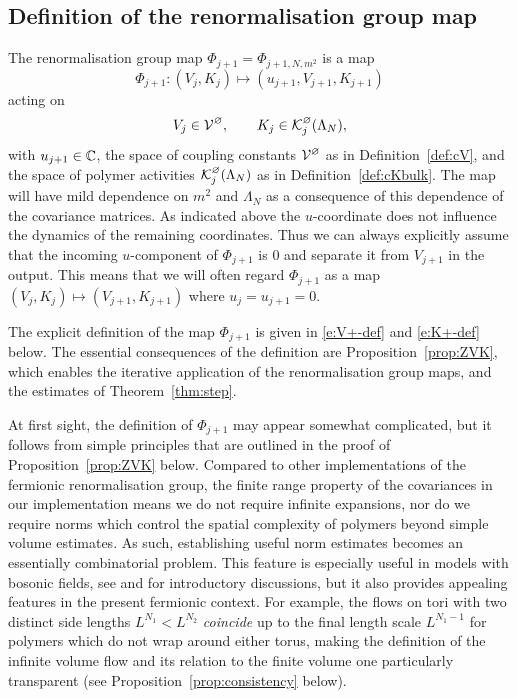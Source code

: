 \documentclass[11pt]{amsart}
\numberwithin{equation}{section}
\numberwithin{theorem}{section}
\newcommand{\1}{{\bf 1}}
\newcommand{\cVbulk}{\cV^\varnothing}
\newcommand{\cKbulk}{\cK^\varnothing}
\begin{document}
\subsection{Definition of the renormalisation group map}
\label{sec:step-def}

The renormalisation group map $\Phi_{j+1} = \Phi_{j+1,N,m^{2}}$ is a map
\begin{equation}
  \Phi_{j+1}\colon (V_j,K_j) \mapsto (u_{j+1},V_{j+1},K_{j+1})
\end{equation}
acting on
\begin{equation}
  V_j  \in \cVbulk, 
  \qquad K_j \in \cKbulk_j(\Lambda_N), 
\end{equation}
with $u_{j+1}\in\mathbb{C}$, the space of coupling constants $\cVbulk$ as in Definition~\ref{def:cV}, and
the space of polymer activities
$\cKbulk_j(\Lambda_N)$ as in Definition~\ref{def:cKbulk}.
%
%
The map will have mild dependence on $m^2$ and $\Lambda_N$ as a
consequence of this dependence of the covariance matrices. As
indicated above the $u$-coordinate does not influence the dynamics of
the remaining coordinates. Thus we can always explicitly assume that
the incoming $u$-component of $\Phi_{j+1}$ is $0$ and separate it from
$V_{j+1}$ in the output.  This means that we will often regard
$\Phi_{j+1}$ as a map $(V_j,K_j) \mapsto (V_{j+1},K_{j+1})$
where $u_j=u_{j+1}=0$.


The explicit definition of the map $\Phi_{j+1}$ is given in
\eqref{e:V+-def} and \eqref{e:K+-def} below. The essential
consequences of the definition are
Proposition~\ref{prop:ZVK}, which enables the iterative application
of the renormalisation group maps, and the estimates of
Theorem~\ref{thm:step}.

At first sight, the definition of $\Phi_{j+1}$ may appear
somewhat complicated, but it follows from simple principles
that are outlined in the proof of Proposition~\ref{prop:ZVK} below.
Compared to other implementations of the
fermionic renormalisation group, the finite range property of the
covariances in our implementation means we do not require infinite
expansions, nor do we require norms which control the spatial
complexity of polymers beyond simple volume estimates.  As such,
establishing useful norm estimates becomes an essentially
combinatorial problem.  This feature is especially useful in models
with bosonic fields, see \cite{MR2070102,MR2523458} and
\cite[Appendix~A]{MR3969983} for introductory discussions, but it
also provides appealing features in the present fermionic
context. For example, the flows on tori
with two distinct side lengths $L^{N_1}<L^{N_2}$ \emph{coincide} up
to the final length scale $L^{N_1-1}$ 
for polymers which do not wrap around either torus, making the
definition of the infinite volume flow and its relation to the
finite volume one particularly transparent (see
Proposition~\ref{prop:consistency} below).
\end{document}
